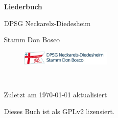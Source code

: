 \begin{titlepage}
\begin{center}
{\sffamily\huge\bfseries Liederbuch\par}
\vspace{1cm}
{\sffamily\Large DPSG Neckarelz-Diedesheim\par}
\vspace{0.5cm}
{\sffamily\Large Stamm Don Bosco\par}
\vspace{0.5cm}
\begin{figure}[h]
\centering
\includegraphics[width=0.4\textwidth]{img/header_dpsgnd.jpg}\par\
\end{figure}
{\sffamily\small Zuletzt am \today{} aktualisiert\par}
\vspace{0.5cm}
{\sffamily\tiny Dieses Buch ist als GPLv2 lizensiert.\par}
\end{center}
\end{titlepage}
